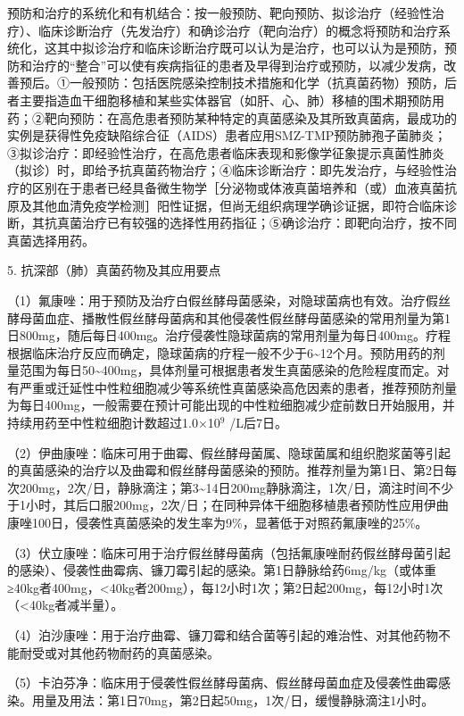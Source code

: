 预防和治疗的系统化和有机结合：按一般预防、靶向预防、拟诊治疗（经验性治疗）、临床诊断治疗（先发治疗）和确诊治疗（靶向治疗）的概念将预防和治疗系统化，这其中拟诊治疗和临床诊断治疗既可以认为是治疗，也可以认为是预防，预防和治疗的“整合”可以使有疾病指征的患者及早得到治疗或预防，以减少发病，改善预后。①一般预防：包括医院感染控制技术措施和化学（抗真菌药物）预防，后者主要指造血干细胞移植和某些实体器官（如肝、心、肺）移植的围术期预防用药；②靶向预防：在高危患者预防某种特定的真菌感染及其所致真菌病，最成功的实例是获得性免疫缺陷综合征（AIDS）患者应用SMZ-TMP预防肺孢子菌肺炎；③拟诊治疗：即经验性治疗，在高危患者临床表现和影像学征象提示真菌性肺炎（拟诊）时，即给予抗真菌药物治疗；④临床诊断治疗：即先发治疗，与经验性治疗的区别在于患者已经具备微生物学［分泌物或体液真菌培养和（或）血液真菌抗原及其他血清免疫学检测］阳性证据，但尚无组织病理学确诊证据，即符合临床诊断，其抗真菌治疗已有较强的选择性用药指征；⑤确诊治疗：即靶向治疗，按不同真菌选择用药。

5. 抗深部（肺）真菌药物及其应用要点

（1）氟康唑：用于预防及治疗白假丝酵母菌感染，对隐球菌病也有效。治疗假丝酵母菌血症、播散性假丝酵母菌病和其他侵袭性假丝酵母菌感染的常用剂量为第1日800mg，随后每日400mg。治疗侵袭性隐球菌病的常用剂量为每日400mg。疗程根据临床治疗反应而确定，隐球菌病的疗程一般不少于6\textasciitilde{}12个月。预防用药的剂量范围为每日50\textasciitilde{}400mg，具体剂量可根据患者发生真菌感染的危险程度而定。对有严重或迁延性中性粒细胞减少等系统性真菌感染高危因素的患者，推荐预防剂量为每日400mg，一般需要在预计可能出现的中性粒细胞减少症前数日开始服用，并持续用药至中性粒细胞计数超过1.0×10$^{9}$
/L后7日。

（2）伊曲康唑：临床可用于曲霉、假丝酵母菌属、隐球菌属和组织胞浆菌等引起的真菌感染的治疗以及曲霉和假丝酵母菌感染的预防。推荐剂量为第1日、第2日每次200mg，2次/日，静脉滴注；第3\textasciitilde{}14日200mg静脉滴注，1次/日，滴注时间不少于1小时，其后口服200mg，2次/日；在同种异体干细胞移植患者预防性应用伊曲康唑100日，侵袭性真菌感染的发生率为9\%，显著低于对照药氟康唑的25\%。

（3）伏立康唑：临床可用于治疗假丝酵母菌病（包括氟康唑耐药假丝酵母菌引起的感染）、侵袭性曲霉病、镰刀霉引起的感染。第1日静脉给药6mg/kg（或体重≥40kg者400mg，\textless{}40kg者200mg），每12小时1次；第2日起200mg，每12小时1次（\textless{}40kg者减半量）。

（4）泊沙康唑：用于治疗曲霉、镰刀霉和结合菌等引起的难治性、对其他药物不能耐受或对其他药物耐药的真菌感染。

（5）卡泊芬净：临床用于侵袭性假丝酵母菌病、假丝酵母菌血症及侵袭性曲霉感染。用量及用法：第1日70mg，第2日起50mg，1次/日，缓慢静脉滴注1小时。

